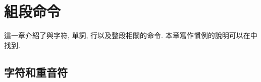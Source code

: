 


\chapter {組段命令}



  

這一章介紹了與字符, 單詞, 行以及整段相關的命令.
本章寫作慣例的說明可以在中找到.

\begindescriptions




\section {字符和重音符}

